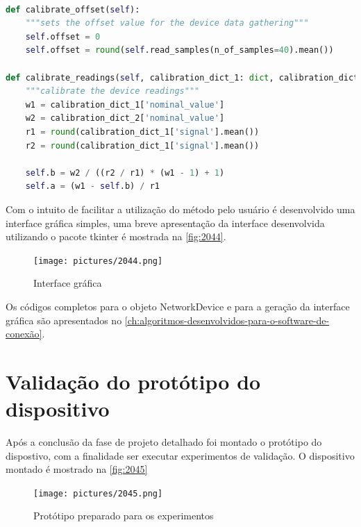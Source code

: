 \begin{lstlisting}[label={lst:objectcalibration},language=Python,caption={[Network Device calibrate offset]{Métodos de calibração do objeto NetworkDevice}}]

def calibrate_offset(self):
	"""sets the offset value for the device data gathering"""
	self.offset = 0
	self.offset = round(self.read_samples(n_of_samples=40).mean())

def calibrate_readings(self, calibration_dict_1: dict, calibration_dict_2: dict):
	"""calibrate the device readings"""
	w1 = calibration_dict_1['nominal_value']
	w2 = calibration_dict_2['nominal_value']
	r1 = round(calibration_dict_1['signal'].mean())
	r2 = round(calibration_dict_1['signal'].mean())

	self.b = w2 / ((r2 / r1) * (w1 - 1) + 1)
	self.a = (w1 - self.b) / r1

\end{lstlisting}

Com o intuito de facilitar a utilização do método pelo usuário é desenvolvido uma interface gráfica simples, uma breve apresentação da interface desenvolvida utilizando o pacote tkinter é mostrada na \autoref{fig:2044}.

\begin{figure}[H]
	\caption{\label{fig:2044} Interface gráfica}
		\begin{center}
			\texttt{[image: pictures/2044.png]}
		\end{center}
\end{figure}

Os códigos completos para o objeto NetworkDevice e para a geração da interface gráfica são apresentados no \autoref{ch:algoritmos-desenvolvidos-para-o-software-de-conexão}.

\section{Validação do protótipo do dispositivo}

Após a conclusão da fase de projeto detalhado foi montado o protótipo do dispostivo, com a finalidade ser executar experimentos de validação. O dispositivo montado é mostrado na \autoref{fig:2045}

\begin{figure}[H]
	\caption{\label{fig:2045} Protótipo preparado para os experimentos}
		\begin{center}
			\texttt{[image: pictures/2045.png]}
		\end{center}
\end{figure}

